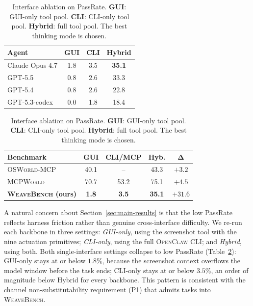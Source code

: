 \documentclass{llmxive}
\providecommand{\Eyeson}{\textsc{WeaveBench}\xspace}
\providecommand{\arraystretch}{1.2}
\begin{document}
\begin{table}[t!]
\centering
\footnotesize
\begin{minipage}[t]{0.49\textwidth}
\centering
\setlength{\tabcolsep}{6pt}
\renewcommand{\arraystretch}{1.05}
\begin{tabular}{l ccc}
\toprule
\textbf{Agent} & \textbf{GUI} & \textbf{CLI} & \textbf{Hybrid} \\
\midrule
Claude Opus 4.7    & 1.8 & 3.5 & \textbf{35.1} \\
GPT-5.5            & 0.8 & 2.6 & 33.3 \\
GPT-5.4            & 0.8 & 2.6 & 22.8 \\
GPT-5.3-codex      & 0.0 & 1.8 & 18.4 \\
\bottomrule
\end{tabular}
\end{minipage}\hfill
\begin{minipage}[t]{0.49\textwidth}
\centering
\setlength{\tabcolsep}{4pt}
\renewcommand{\arraystretch}{1.05}
\caption{Cross-benchmark hybrid gain on PassRate (\%), with $\boldsymbol{\Delta}$ giving the gain from the additional interface.}
\label{tab:cross-bench-gap}
\begin{tabular}{@{}l c c c c@{}}
\toprule
\textbf{Benchmark} & \textbf{GUI} & \textbf{CLI/MCP} & \textbf{Hyb.} & $\boldsymbol{\Delta}$ \\
\midrule
\textsc{OSWorld-MCP}      & 40.1 & --   & 43.3 & $+3.2$ \\
\textsc{MCPWorld}         & 70.7 & 53.2 & 75.1 & $+4.5$ \\
\rowcolor{msfthighlight}
\textbf{\Eyeson{} (ours)} & \textbf{1.8} & \textbf{3.5} & \textbf{35.1} & $\mathbf{+31.6}$ \\
\bottomrule
\end{tabular}
\end{minipage}
\caption{Interface ablation on PassRate. \textbf{GUI}: GUI-only tool pool. \textbf{CLI}: CLI-only tool pool. \textbf{Hybrid}: full tool pool. The best thinking mode is chosen.}
\label{tab:channel-ablation}
\end{table}

A natural concern about Section~\ref{sec:main-results} is that the low PassRate reflects harness friction rather than genuine cross-interface difficulty. We re-run each backbone in three settings: \emph{GUI-only}, using the screenshot tool with the nine actuation primitives; \emph{CLI-only}, using the full \textsc{OpenClaw} CLI; and \emph{Hybrid}, using both. Both single-interface settings collapse to low PassRate (Table~\ref{tab:channel-ablation}): GUI-only stays at or below $1.8\%$, because the screenshot context overflows the model window before the task ends; CLI-only stays at or below $3.5\%$, an order of magnitude below Hybrid for every backbone. This pattern is consistent with the channel non-substitutability requirement (P1) that admits tasks into \Eyeson{}.
\end{document}
